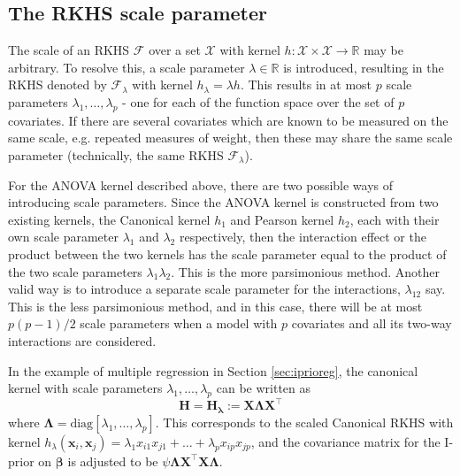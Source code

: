 \subsection{The RKHS scale parameter}
\label{sec:scale}

The scale of an RKHS $\mathcal{F}$ over a set $\mathcal{X}$ with kernel $h:\mathcal X \times \mathcal X \rightarrow \mathbb R$ may be arbitrary. To resolve this, a scale parameter $\lambda \in \mathbb{R}$ is introduced, resulting in the RKHS denoted by $\mathcal{F}_\lambda$ with kernel $h_\lambda = \lambda h$. This results in at most $p$ scale parameters $\lambda_1, \dots, \lambda_p$ - one for each of the function space over the set of $p$ covariates. If there are several covariates which are known to be measured on the same scale, e.g. repeated measures of weight, then these may share the same scale parameter (technically, the same RKHS $\mathcal{F}_\lambda$).

\vspace{3mm}
\begin{remark}
	For the ANOVA kernel described above, there are two possible ways of introducing scale parameters. Since the ANOVA kernel is constructed from two existing kernels, the Canonical kernel $h_1$ and Pearson kernel $h_2$, each with their own scale parameter $\lambda_1$ and $\lambda_2$ respectively, then the interaction effect or the product between the two kernels has the scale parameter equal to the product of the two scale parameters $\lambda_1\lambda_2$. This is the more parsimonious method. Another valid way is to introduce a separate scale parameter for the interactions, $\lambda_{12}$ say. This is the less parsimonious method, and in this case, there will be at most $p(p-1)/2$ scale parameters when a model with $p$ covariates and all its two-way interactions are considered.
\end{remark}

In the example of multiple regression in Section \ref{sec:iprioreg}, the canonical kernel with scale parameters $\lambda_1, \dots, \lambda_p$ can be written as
\[
	\mathbf H = \mathbf H_{\boldsymbol\lambda} := \mathbf X \boldsymbol\Lambda \mathbf X^\top
\]
where $\boldsymbol\Lambda = \text{diag}[\lambda_1, \dots, \lambda_p]$. This corresponds to the scaled Canonical RKHS with kernel $h_\lambda(\mathbf x_i, \mathbf x_j) = \lambda_1 x_{i1} x_{j1} + \dots + \lambda_p x_{ip} x_{jp}$, and the covariance matrix for the I-prior on $\boldsymbol\beta$ is adjusted to be $\psi\boldsymbol\Lambda \mathbf X ^\top \mathbf X \boldsymbol\Lambda$.

